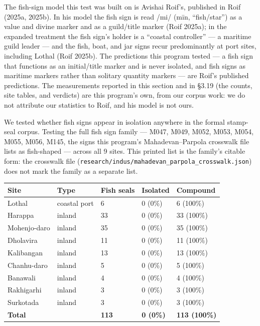 \documentclass[11pt]{article}
\newcounter{none} %
\begin{document}
The fish-sign model this test was built on is Avishai Roif's,
published in Roif (2025a, 2025b). In his model the fish sign is read
/mi/ (m\={i}n, ``fish/star'') as a value and divine marker and as a
guild/title marker (Roif 2025a); in the expanded treatment the
fish sign's holder is a ``coastal controller'' --- a maritime
guild leader --- and the fish, boat, and jar signs recur
predominantly at port sites, including Lothal (Roif 2025b). The
predictions this program tested --- a fish sign that functions as
an initial/title marker and is never isolated, and fish signs as
maritime markers rather than solitary quantity markers --- are
Roif's published predictions. The measurements reported in this
section and in \S3.19 (the counts, site tables, and verdicts) are
this program's own, from our corpus work: we do not attribute
our statistics to Roif, and his model is not ours.

We tested whether fish signs appear in isolation anywhere in the formal stamp-seal corpus.
Testing the full fish sign family --- M047, M049, M052, M053, M054, M055, M056, M145, the signs this program's Mahadevan--Parpola crosswalk file lists as fish-shaped --- across all 9 sites. This printed list is the family's citable form: the crosswalk file (\texttt{research/indus/mahadevan\_parpola\_crosswalk.json}) does not mark the family as a separate list.

{\def\LTcaptype{none} %
\begin{longtable}[]{@{}lllll@{}}
\toprule\noalign{}
Site & Type & Fish seals & Isolated & Compound \\
\midrule\noalign{}
\endhead
\bottomrule\noalign{}
\endlastfoot
Lothal & coastal port & 6 & 0 (0\%) & 6 (100\%) \\
Harappa & inland & 33 & 0 (0\%) & 33 (100\%) \\
Mohenjo-daro & inland & 35 & 0 (0\%) & 35 (100\%) \\
Dholavira & inland & 11 & 0 (0\%) & 11 (100\%) \\
Kalibangan & inland & 13 & 0 (0\%) & 13 (100\%) \\
Chanhu-daro & inland & 5 & 0 (0\%) & 5 (100\%) \\
Banawali & inland & 4 & 0 (0\%) & 4 (100\%) \\
Rakhigarhi & inland & 3 & 0 (0\%) & 3 (100\%) \\
Surkotada & inland & 3 & 0 (0\%) & 3 (100\%) \\
\textbf{Total} & & \textbf{113} & \textbf{0 (0\%)} & \textbf{113
(100\%)} \\
\end{longtable}
}
\end{document}
